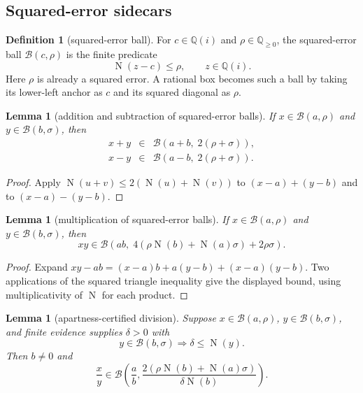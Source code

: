\documentclass[10pt]{article}
\newtheorem{lemma}[theorem]{Lemma}
\theoremstyle{definition}
\newtheorem{definition}[theorem]{Definition}
\theoremstyle{remark}
\newcommand{\Q}{\mathbb{Q}}
\newcommand{\Qi}{\mathbb{Q}(i)}
\newcommand{\Norm}{\operatorname{N}}
\begin{document}
\subsection{Squared-error sidecars}

\begin{definition}[squared-error ball]
For $c\in\Qi$ and $\rho\in\Q_{\ge0}$, the squared-error ball
$\mathcal B(c,\rho)$ is the finite predicate
\[
 \Norm(z-c)\le\rho,
 \qquad z\in\Qi.
\tag{2.12}
\]
Here $\rho$ is already a squared error.  A rational box becomes such a ball by taking its lower-left anchor as $c$ and its squared diagonal as $\rho$.
\end{definition}

\begin{lemma}[addition and subtraction of squared-error balls]
If $x\in\mathcal B(a,\rho)$ and $y\in\mathcal B(b,\sigma)$, then
\[
\begin{array}{rcl}
 x+y&\in&\mathcal B(a+b,\;2(\rho+\sigma)),\\
 x-y&\in&\mathcal B(a-b,\;2(\rho+\sigma)).
\end{array}
\tag{2.13}
\]
\end{lemma}

\begin{proof}
Apply $\Norm(u+v)\le2(\Norm(u)+\Norm(v))$ to
$(x-a)+(y-b)$ and to $(x-a)-(y-b)$.
\end{proof}

\begin{lemma}[multiplication of squared-error balls]
If $x\in\mathcal B(a,\rho)$ and $y\in\mathcal B(b,\sigma)$, then
\[
 xy\in\mathcal B\!\left(ab,\;
 4(\rho\Norm(b)+\Norm(a)\sigma)+2\rho\sigma\right).
\tag{2.13a}
\]
\end{lemma}

\begin{proof}
Expand $xy-ab=(x-a)b+a(y-b)+(x-a)(y-b)$.  Two applications of the
squared triangle inequality give the displayed bound, using
multiplicativity of $\Norm$ for each product.
\end{proof}

\begin{lemma}[apartness-certified division]
Suppose $x\in\mathcal B(a,\rho)$, $y\in\mathcal B(b,\sigma)$, and finite
evidence supplies $\delta>0$ with
\[
 y\in\mathcal B(b,\sigma)\Longrightarrow
 \delta\le\Norm(y).
\tag{2.14}
\]
Then $b\ne0$ and
\[
 \frac{x}{y}\in
 \mathcal B\!\left(\frac ab,
 \frac{2(\rho\Norm(b)+\Norm(a)\sigma)}
      {\delta\Norm(b)}\right).
\tag{2.15}
\]
\end{lemma}
\end{document}
